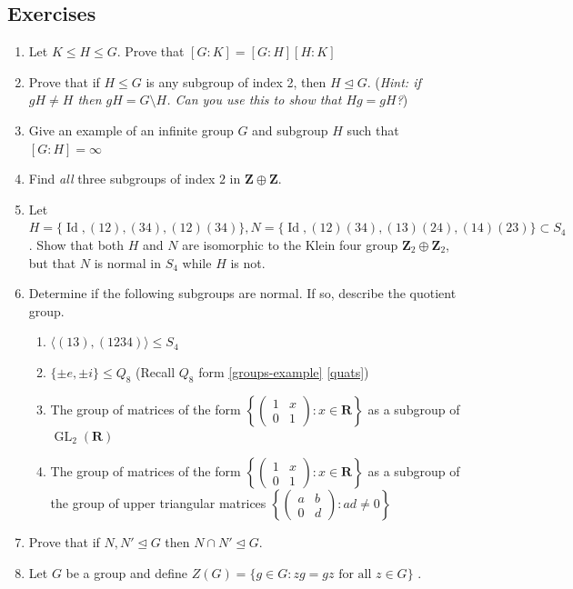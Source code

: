 \documentclass[12pt]{article}
\numberwithin{equation}{subsection}
\theoremstyle{note}
\newcommand{\GL}{\operatorname{GL}}
\newcommand{\Id}{\operatorname{Id}}
\newcommand{\nrml}{\trianglelefteq}
\begin{document}
\subsection{Exercises}
\begin{enumerate}[label=\arabic*.]
	\item Let $K\leq H \leq G$. Prove that $[G:K]=[G:H][H:K]$
	\item \label{subgroup-of-index-2} Prove that if $H\leq G$ is any subgroup of index 2, then $H\nrml G$. (\textit{Hint: if $gH\neq H$ then $gH=G\setminus H$. Can you use this to show that $Hg=gH$?})
	\item Give an example of an infinite group $G$ and subgroup $H$ such that $[G:H]=\infty$
	\item Find \textit{all} three subgroups of index $2$ in $\mathbf{Z}\oplus \mathbf{Z}$.
	\item Let $H=\{ \Id, (12), (34), (12)(34)\}, N=\{\Id, (12)(34), (13)(24), (14)(23)\} \subset S_4$. Show that both $H$ and $N$ are isomorphic to the Klein four group $\mathbf{Z}_2\oplus \mathbf{Z}_2$, but that $N$ is normal in $S_4$ while $H$ is not. 
	\item Determine if the following subgroups are normal. If so, describe the quotient group.
		\begin{enumerate}
			\item $\langle (13), (1234) \rangle \leq S_4$
			\item $\{\pm e,  \pm i \} \leq Q_8$ \qquad (Recall $Q_8$ form \ref{groups-example} \ref{quats})
			\item The group of matrices of the form $\left \{ \begin{pmatrix} 1 & x \\ 0 & 1\end{pmatrix} : x\in \mathbf{R}\right\}$ as a subgroup of $\GL_2(\mathbf{R})$
			\item The group of matrices of the form $\left \{ \begin{pmatrix} 1 & x \\ 0 & 1\end{pmatrix} : x\in \mathbf{R}\right\}$ as a subgroup of the group of upper triangular matrices $\left \{ \begin{pmatrix} a & b \\ 0 & d\end{pmatrix} : ad\neq 0\right\}$
		\end{enumerate}
	\item Prove that if $N,N'\nrml G$ then $N\cap N'\nrml G$.
	\item Let $G$ be a group and define $Z(G)=\{g\in G: zg=gz \text{ for all $z\in G$}\}$ .

\end{enumerate}
\end{document}
